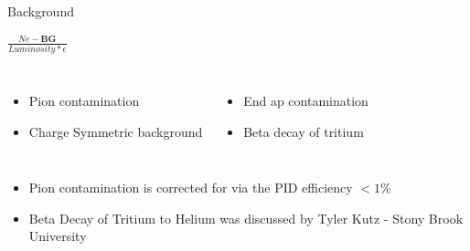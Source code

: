 \documentclass{beamer}
\begin{document}
\begin{frame}{Background}
	\begin{block}{$\frac{Ne - \textbf{BG} }{Luminosity *  \epsilon}$}
		\begin{columns}
			\begin{itemize}
				\item Pion contamination
				\item Charge Symmetric background
			\end{itemize}
			\begin{itemize}
				\item End ap contamination
   				\item Beta decay of tritium
   			\end{itemize}
		\end{columns}	
		\begin{itemize}
			\item Pion contamination is corrected for via the PID efficiency  $ < 1\%$ 
			\item Beta Decay of Tritium to Helium was discussed by Tyler Kutz - Stony Brook University 
		\end{itemize}		
	\end{block}
\end{frame}
\end{document}
